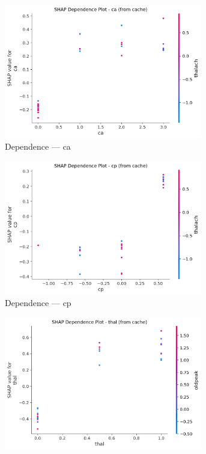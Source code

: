\begin{figure}[H]
\centering
\begin{subfigure}[b]{0.31\textwidth}
\centering
\includegraphics[width=0.95\textwidth]{Result/cleveland_dataset/LightGBM/SHAP/Dependence CA.png}
\caption{Dependence — ca}
\label{fig:lgbm_clev_dep_ca}
\end{subfigure}\hfill
\begin{subfigure}[b]{0.31\textwidth}
\centering
\includegraphics[width=0.95\textwidth]{Result/cleveland_dataset/LightGBM/SHAP/Dependence CP.png}
\caption{Dependence — cp}
\label{fig:lgbm_clev_dep_cp}
\end{subfigure}\hfill
\begin{subfigure}[b]{0.31\textwidth}
\centering
\includegraphics[width=0.95\textwidth]{Result/cleveland_dataset/LightGBM/SHAP/Dependence thal.png}

\end{subfigure}
\end{figure}
